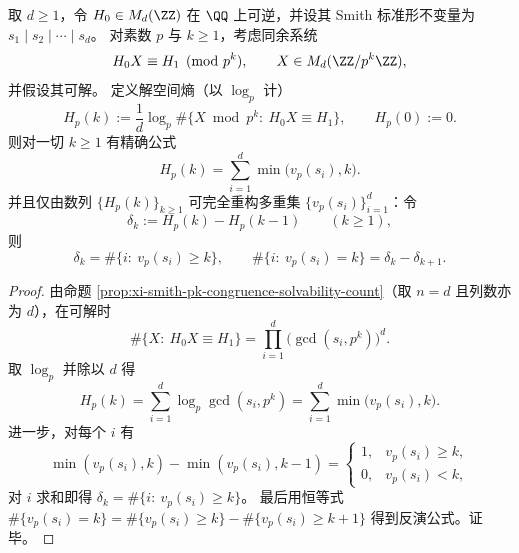 \begin{theorem}\label{thm:xi-smith-entropy-inverts-vp-invariants}
取 \(d\ge 1\)，令 \(H_0\in M_d(\ZZ)\) 在 \(\QQ\) 上可逆，并设其 Smith 标准形不变量为
\(
s_1\mid s_2\mid\cdots\mid s_d
\)。
对素数 \(p\) 与 \(k\ge 1\)，考虑同余系统
\[
H_0X\equiv H_1\pmod{p^k},\qquad X\in M_d(\ZZ/p^k\ZZ),
\]
并假设其可解。
定义解空间熵（以 \(\log_p\) 计）
\[
H_p(k):=\frac{1}{d}\log_p\#\bigl\{X\bmod p^k:\ H_0X\equiv H_1\bigr\},
\qquad H_p(0):=0.
\]
则对一切 \(k\ge 1\) 有精确公式
\[
H_p(k)=\sum_{i=1}^{d}\min\bigl(v_p(s_i),k\bigr).
\]
并且仅由数列 \(\{H_p(k)\}_{k\ge 1}\) 可完全重构多重集 \(\{v_p(s_i)\}_{i=1}^{d}\)：令
\[
\delta_k:=H_p(k)-H_p(k-1)\qquad(k\ge 1),
\]
则
\[
\delta_k=\#\{i:\ v_p(s_i)\ge k\},
\qquad
\#\{i:\ v_p(s_i)=k\}=\delta_k-\delta_{k+1}.
\]
\end{theorem}
\begin{proof}
由命题 \ref{prop:xi-smith-pk-congruence-solvability-count}（取 \(n=d\) 且列数亦为 \(d\)），在可解时
\[
\#\{X:\ H_0X\equiv H_1\}
=\prod_{i=1}^{d}\bigl(\gcd(s_i,p^k)\bigr)^{d}.
\]
取 \(\log_p\) 并除以 \(d\) 得
\[
H_p(k)=\sum_{i=1}^{d}\log_p\gcd(s_i,p^k)
=\sum_{i=1}^{d}\min\bigl(v_p(s_i),k\bigr).
\]
进一步，对每个 \(i\) 有
\[
\min(v_p(s_i),k)-\min(v_p(s_i),k-1)=
\begin{cases}
1,& v_p(s_i)\ge k,\\
0,& v_p(s_i)< k,
\end{cases}
\]
对 \(i\) 求和即得 \(\delta_k=\#\{i:\ v_p(s_i)\ge k\}\)。
最后用恒等式
\(
\#\{v_p(s_i)=k\}=\#\{v_p(s_i)\ge k\}-\#\{v_p(s_i)\ge k+1\}
\)
得到反演公式。证毕。
\end{proof}




